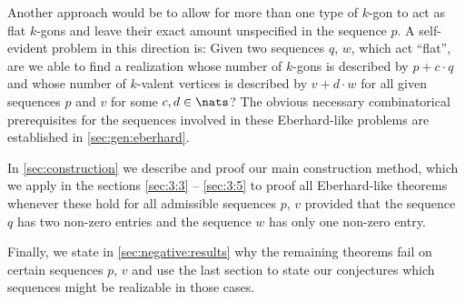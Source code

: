 Another approach would be to allow for more than one type of $k$-gon to act as flat $k$-gons and leave their exact amount unspecified in the sequence $p$. A self-evident problem in this direction is: Given two sequences $q$, $w$, which act ``flat'', are we able to find a realization whose number of $k$-gons is described by $p + c\cdot q$ and whose number of $k$-valent vertices is described by $v + d\cdot w$ for all given sequences $p$ and $v$ for some $c, d \in \nats$? The obvious necessary combinatorical prerequisites for the sequences involved in these {\sc Eberhard}-like problems are established in \autoref{sec:gen:eberhard}.

In \autoref{sec:construction} we describe and proof our main construction method, which we apply in the sections \autoref{sec:3:3} -- \autoref{sec:3:5} to proof all {\sc Eberhard}-like theorems whenever these hold for all admissible sequences $p$, $v$ provided that the sequence $q$ has two non-zero entries and the sequence $w$ has only one non-zero entry.

Finally, we state in \autoref{sec:negative:results} why the remaining theorems fail on certain sequences $p$, $v$ and use the last section to state our conjectures which sequences might be realizable in those cases.